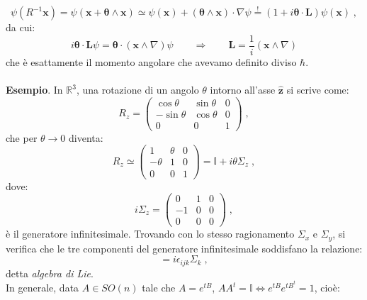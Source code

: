 \documentclass[12pt,a4paper]{report}
\theoremstyle{definition}
\numberwithin{equation}{section}
\begin{document}
\begin{equation}
\psi(R^{-1}\mathbf{x})=\psi(\mathbf{x}+\boldsymbol{\theta}\wedge\mathbf{x})\simeq \psi(\mathbf{x})+(\boldsymbol{\theta} \wedge \mathbf{x})\cdot \nabla\psi \stackrel{!}{=} (1+i\boldsymbol{\theta}\cdot\mathbf{L})\psi(\mathbf{x})\;,
\end{equation}
da cui:
\begin{equation}
i\boldsymbol{\theta}\cdot\mathbf{L}\psi=\boldsymbol{\theta}\cdot(\mathbf{x}\wedge \nabla)\psi \qquad \Longrightarrow \qquad \mathbf{L}=\frac{1}{i}(\mathbf{x}\wedge\nabla)
\end{equation}
che è esattamente il momento angolare che avevamo definito diviso $\hbar$. \\
\\
\textbf{Esempio}. In $\mathbb{R}^3$, una rotazione di un angolo $\theta$ intorno all'asse $\hat{\mathbf{z}}$ si scrive come:
\begin{equation}
R_z=\left(\begin{matrix}
\cos\theta & \sin\theta & 0 \\
-\sin\theta & \cos\theta & 0 \\
0 & 0 & 1
\end{matrix}\right)\;,
\end{equation}
che per $\theta\to 0$ diventa:
\begin{equation}
R_z\simeq\left(\begin{matrix}
1 & \theta & 0 \\
-\theta & 1 & 0 \\
0 & 0 & 1
\end{matrix}\right)=\mathbb{I}+i\theta\Sigma_z\;,
\end{equation}
dove:
\begin{equation}
i\Sigma_z=\left(\begin{matrix}
0 & 1 & 0 \\
-1 & 0 & 0 \\
0 & 0 & 0
\end{matrix}\right)\;,
\end{equation}
è il generatore infinitesimale. Trovando con lo stesso ragionamento $\Sigma_x$ e $\Sigma_y$, si verifica che le tre componenti del generatore infinitesimale soddisfano la relazione:
\begin{equation}
[\Sigma_i,\Sigma_j]=i\epsilon_{ijk}\Sigma_k\;,
\end{equation}
detta \textit{algebra di Lie}. \\
In generale, data $A\in SO(n)$ tale che $A=e^{tB}$, $AA^t=\mathbb{I}\Longleftrightarrow e^{tB}e^{tB^t}=1$, cioè:
\end{document}
